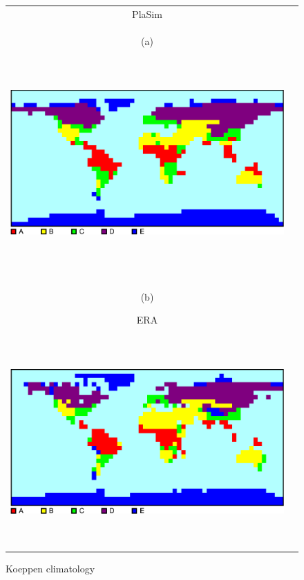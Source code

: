 \documentclass[12pt,a4paper,twoside,openright,headinclude,liststotoc,bibtotoc]{scrreprt}
\begin{document}
\begin{figure}[c]
\begin{tabular}{cc}
\hspace{-0.5cm}PlaSim \vspace{-0.2cm}
\\
\begin{minipage}{1.0\textwidth}\hspace{1.01cm}\begin{scriptsize}(a)\end{scriptsize} \vspace{-0.05cm}
\begin{center}
\includegraphics[height=8.0cm]{eps/koep_ctrl.eps}
\end{center}
\end{minipage}
\\
\\
\\
\begin{minipage}{1.0\textwidth}\begin{scriptsize}\hspace{1.01cm}(b)\end{scriptsize}\hspace{6.5cm}ERA\vspace{-0.05cm}
\begin{center}
\includegraphics[height=8.0cm]{eps/koep_era.eps}
\end{center}
\end{minipage}
\end{tabular}
\caption[Koeppen climatology]{Koeppen climatology}
\label{img:koeppen}
\end{figure}
\end{document}
